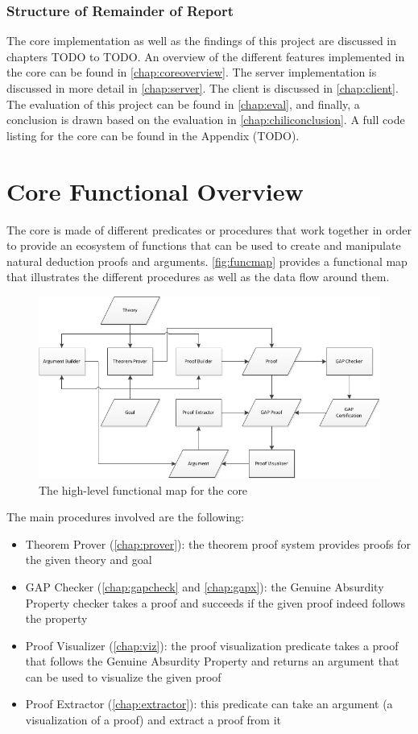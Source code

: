 \documentclass[11pt,twoside,a4paper]{report}
\begin{document}
\subsection{Structure of Remainder of Report}
The core implementation as well as the findings of this project are discussed in chapters TODO to TODO. An overview of the different features implemented in the core can be found in \autoref{chap:coreoverview}. The server implementation is discussed in more detail in \autoref{chap:server}. The client is discussed in \autoref{chap:client}. The evaluation of this project can be found in \autoref{chap:eval}, and finally, a conclusion is drawn based on the evaluation in \autoref{chap:chiliconclusion}. A full code listing for the core can be found in the Appendix (TODO).

\chapter{Core Functional Overview}
\label{chap:coreoverview}
The core is made of different predicates or procedures that work together in order to provide an ecosystem of functions that can be used to create and manipulate natural deduction proofs and arguments. \autoref{fig:funcmap} provides a functional map that illustrates the different procedures as well as the data flow around them.

\begin{figure}[ht]
\centerline{\includegraphics[scale=0.85]{img/functional-map.png}}
\caption{The high-level functional map for the core\label{fig:funcmap}}
\end{figure}

The main procedures involved are the following:
\begin{itemize}
\item
Theorem Prover (\autoref{chap:prover}): the theorem proof system provides proofs for the given theory and goal
\item
GAP Checker (\autoref{chap:gapcheck} and \autoref{chap:gapx}): the Genuine Absurdity Property checker takes a proof and succeeds if the given proof indeed follows the property
\item
Proof Visualizer (\autoref{chap:viz}): the proof visualization predicate takes a proof that follows the Genuine Absurdity Property and returns an argument that can be used to visualize the given proof
\item
Proof Extractor (\autoref{chap:extractor}): this predicate can take an argument (a visualization of a proof) and extract a proof from it
\end{itemize}
\end{document}
